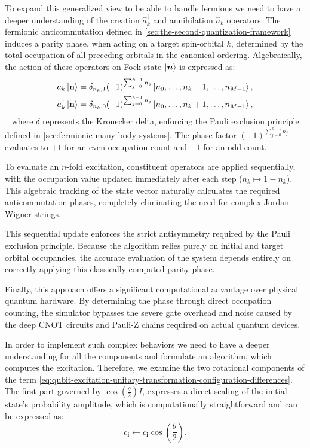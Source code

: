 To expand this generalized view to be able to handle fermions we need to have a deeper understanding of the creation $\hat{a}^{\dagger}_k$ and annihilation $\hat{a}_k$ operators.
The fermionic anticommutation defined in \eqref{sec:the-second-quantization-framework} induces a parity phase, when acting on a target spin-orbital $k$, determined by the total occupation of all preceding orbitals in the canonical ordering.
Algebraically, the action of these operators on Fock state $\ket{\boldsymbol{n}}$ is expressed as:
\begin{align} \label{eq:annhiliation-creation-algebraic-definition}
    a_k \ket{\mathbf{n}} &= \delta_{n_k, 1} (-1)^{\sum_{j=0}^{k-1} n_j} \ket{n_0, \dots, n_k - 1, \dots, n_{M-1}}, \\
    a_k^\dagger \ket{\mathbf{n}} &= \delta_{n_k, 0} (-1)^{\sum_{j=0}^{k-1} n_j} \ket{n_0, \dots, n_k + 1, \dots, n_{M-1}},
\end{align}~\cite[Box 1.1]{helgaker2000molecular}
where $\delta$ represents the Kronecker delta, enforcing the Pauli exclusion principle defined in \eqref{sec:fermionic-many-body-systems}.
The phase factor $(-1)^{\sum_{j=0}^{k-1} n_j}$ evaluates to $+1$ for an even occupation count and $-1$ for an odd count.

To evaluate an $n$-fold excitation, constituent operators are applied sequentially, with the occupation value updated immediately after each step ($n_k \mapsto 1 - n_k$). This algebraic tracking of the state vector naturally calculates the required anticommutation phases, completely eliminating the need for complex Jordan-Wigner strings.

This sequential update enforces the strict antisymmetry required by the Pauli exclusion principle. Because the algorithm relies purely on initial and target orbital occupancies, the accurate evaluation of the system depends entirely on correctly applying this classically computed parity phase.

Finally, this approach offers a significant computational advantage over physical quantum hardware. By determining the phase through direct occupation counting, the simulator bypasses the severe gate overhead and noise caused by the deep CNOT circuits and Pauli-Z chains required on actual quantum devices.
\cite[chapter III.B]{anand2022quantum}\cite[chapter 2.1.1]{schleich2025quantum}

In order to implement such complex behaviors we need to have a deeper understanding for all the components and formulate an algorithm, which computes the excitation.
Therefore, we examine the two rotational components of the term \eqref{eq:qubit-excitation-unitary-transformation-configuration-differences}.
The first part governed by $\cos\left(\frac{\theta}{2}\right) I$, expresses a direct scaling of the initial state's probability amplitude, which is computationally straightforward and can be expressed as:
\begin{equation}
    c_{\boldsymbol{i}} \leftarrow c_{\boldsymbol{i}} \cos\left(\frac{\theta}{2}\right).\label{eq:qubit-excitation-update-basis-state}
\end{equation}

